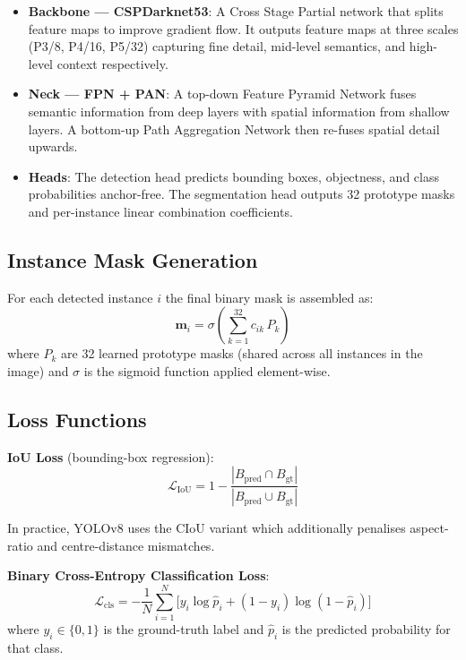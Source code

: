 \documentclass[12pt, a4paper]{article}
\begin{document}
\begin{itemize}
    \item \textbf{Backbone — CSPDarknet53}: A Cross Stage Partial network
          that splits feature maps to improve gradient flow.  It outputs
          feature maps at three scales (P3/8, P4/16, P5/32) capturing
          fine detail, mid-level semantics, and high-level context
          respectively.
    \item \textbf{Neck — FPN + PAN}: A top-down Feature Pyramid Network
          fuses semantic information from deep layers with spatial
          information from shallow layers.  A bottom-up Path Aggregation
          Network then re-fuses spatial detail upwards.
    \item \textbf{Heads}: The detection head predicts bounding boxes,
          objectness, and class probabilities anchor-free.  The
          segmentation head outputs 32 prototype masks and per-instance
          linear combination coefficients.
\end{itemize}

\subsection{Instance Mask Generation}

For each detected instance $i$ the final binary mask is assembled as:
\begin{equation}
\mathbf{m}_i = \sigma\!\left(\sum_{k=1}^{32} c_{ik}\,P_k\right)
\label{eq:maskseg}
\end{equation}
where $P_k$ are 32 learned prototype masks (shared across all instances in
the image) and $\sigma$ is the sigmoid function applied element-wise.

\subsection{Loss Functions}

\textbf{IoU Loss} (bounding-box regression):
\begin{equation}
\mathcal{L}_{\text{IoU}} = 1 - \frac{|B_{\text{pred}} \cap B_{\text{gt}}|}
                                     {|B_{\text{pred}} \cup B_{\text{gt}}|}
\label{eq:iouloss}
\end{equation}

\noindent In practice, YOLOv8 uses the CIoU variant which additionally
penalises aspect-ratio and centre-distance mismatches.

\textbf{Binary Cross-Entropy Classification Loss}:
\begin{equation}
\mathcal{L}_{\text{cls}} =
  -\frac{1}{N}\sum_{i=1}^{N}
  \bigl[y_i\log\hat{p}_i + (1-y_i)\log(1-\hat{p}_i)\bigr]
\label{eq:bce}
\end{equation}
where $y_i \in \{0,1\}$ is the ground-truth label and $\hat{p}_i$ is the
predicted probability for that class.
\end{document}
